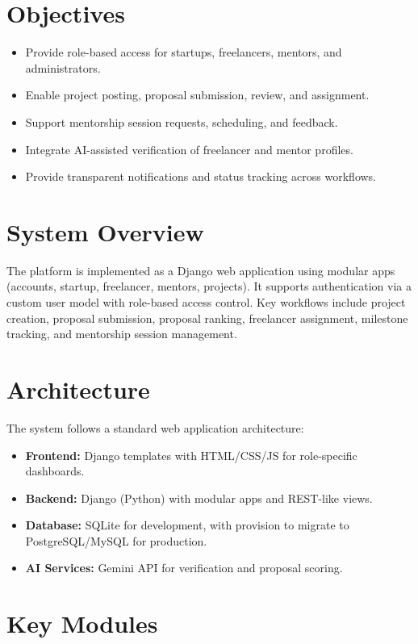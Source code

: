 ﻿\documentclass[journal]{IEEEtran}
\begin{document}
\section{Objectives}
\begin{itemize}
    \item Provide role-based access for startups, freelancers, mentors, and administrators.
    \item Enable project posting, proposal submission, review, and assignment.
    \item Support mentorship session requests, scheduling, and feedback.
    \item Integrate AI-assisted verification of freelancer and mentor profiles.
    \item Provide transparent notifications and status tracking across workflows.
\end{itemize}

\section{System Overview}
The platform is implemented as a Django web application using modular apps (accounts, startup, freelancer, mentors, projects). It supports authentication via a custom user model with role-based access control. Key workflows include project creation, proposal submission, proposal ranking, freelancer assignment, milestone tracking, and mentorship session management.

\section{Architecture}
The system follows a standard web application architecture:
\begin{itemize}
    \item \textbf{Frontend:} Django templates with HTML/CSS/JS for role-specific dashboards.
    \item \textbf{Backend:} Django (Python) with modular apps and REST-like views.
    \item \textbf{Database:} SQLite for development, with provision to migrate to PostgreSQL/MySQL for production.
    \item \textbf{AI Services:} Gemini API for verification and proposal scoring.
\end{itemize}

\section{Key Modules}
\end{document}
